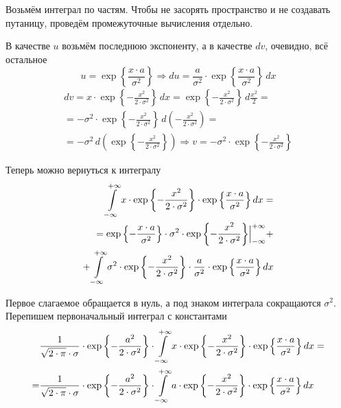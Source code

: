 Возьмём интеграл по частям.
Чтобы не засорять пространство и не создавать путаницу,
проведём промежуточные вычисления отдельно.

В качестве $u$ возьмём последнюю экспоненту,
а в качестве $dv$, очевидно, всё остальное
$$u = \exp{\left\{ \frac{x \cdot a}{\sigma^2} \right\}}
    \Rightarrow du = \frac{a}{\sigma^2}
        \cdot \exp{\left\{ \frac{x \cdot a}{\sigma^2} \right\}} \, dx$$
\begin{align*}
    dv
        = x \cdot \exp{\left\{ - \frac{x^2}{2 \cdot \sigma^2} \right\}} \, dx
        = \exp{\left\{ - \frac{x^2}{2 \cdot \sigma^2} \right\}}
            \, d\frac{x^2}{2} = \\
        = - \sigma^2 \cdot \exp{\left\{ - \frac{x^2}{2 \cdot \sigma^2} \right\}}
            \, d\left( - \frac{x^2}{2 \cdot \sigma^2} \right) = \\
        = - \sigma^2 \, d\left( \exp{\left\{ - \frac{x^2}
            {2 \cdot \sigma^2} \right\}} \right)
        \Rightarrow v = - \sigma^2 \cdot
            \exp{\left\{ - \frac{x^2}{2 \cdot \sigma^2} \right\}}
\end{align*}

Теперь можно вернуться к интегралу
\begin{align*}
    \integral{-\infty}{+\infty}{x}{
            x \cdot \exp{\left\{ - \frac{x^2}{2 \cdot \sigma^2} \right\}}
            \cdot \exp{\left\{ \frac{x \cdot a}{\sigma^2} \right\}}} = \\
        = \Bigl. \exp{\left\{ - \frac{x \cdot a}{\sigma^2} \right\}}
                \cdot \sigma^2
                \cdot \exp{\left\{ - \frac{x^2}{2 \cdot \sigma^2} \right\}}
                \Bigr|_{-\infty}^{+\infty} + \\
            + \integral{-\infty}{+\infty}{x}{ \sigma^2
                \cdot \exp{\left\{ - \frac{x^2}{2 \cdot \sigma^2} \right\}}
                \cdot \frac{a}{\sigma^2}
                \cdot \exp{\left\{ \frac{x \cdot a}{\sigma^2} \right\}}}
\end{align*}

Первое слагаемое обращается в нуль,
а под знаком интеграла сокращаются $\sigma^2$.
Перепишем первоначальный интеграл с константами
\begin{align*}
    &\frac{1}{\sqrt{2 \cdot \pi} \cdot \sigma}
                \cdot \exp{\left\{ - \frac{a^2}{2 \cdot \sigma^2} \right\}}
            \cdot \integral{-\infty}{+\infty}{x}{
                x \cdot \exp{\left\{ - \frac{x^2}{2 \cdot \sigma^2} \right\}}
                \cdot \exp{\left\{ \frac{x \cdot a}{\sigma^2} \right\}}} = \\
        = &\frac{1}{\sqrt{2 \cdot \pi} \cdot \sigma}
            \cdot \exp{\left\{ - \frac{a^2}{2 \cdot \sigma^2} \right\}}
            \cdot \integral{-\infty}{+\infty}{x}{
                a \cdot \exp{\left\{ - \frac{x^2}{2 \cdot \sigma^2} \right\}}
                \cdot \exp{\left\{ \frac{x \cdot a}{\sigma^2} \right\}}}
\end{align*}

